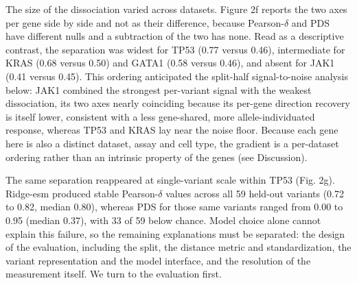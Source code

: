 \documentclass[11pt,letterpaper]{article}
\begin{document}
The size of the dissociation varied across datasets. Figure 2f reports the two axes per gene side by side and not as their difference, because Pearson-$\delta$ and PDS have different nulls and a subtraction of the two has none. Read as a descriptive contrast, the separation was widest for TP53 (0.77 versus 0.46), intermediate for KRAS (0.68 versus 0.50) and GATA1 (0.58 versus 0.46), and absent for JAK1 (0.41 versus 0.45). This ordering anticipated the split-half signal-to-noise analysis below: JAK1 combined the strongest per-variant signal with the weakest dissociation, its two axes nearly coinciding because its per-gene direction recovery is itself lower, consistent with a less gene-shared, more allele-individuated response, whereas TP53 and KRAS lay near the noise floor. Because each gene here is also a distinct dataset, assay and cell type, the gradient is a per-dataset ordering rather than an intrinsic property of the genes (see Discussion).

The same separation reappeared at single-variant scale within TP53 (Fig. 2g). Ridge-esm produced stable Pearson-$\delta$ values across all 59 held-out variants (0.72 to 0.82, median 0.80), whereas PDS for those same variants ranged from 0.00 to 0.95 (median 0.37), with 33 of 59 below chance. Model choice alone cannot explain this failure, so the remaining explanations must be separated: the design of the evaluation, including the split, the distance metric and standardization, the variant representation and the model interface, and the resolution of the measurement itself. We turn to the evaluation first.
\end{document}
